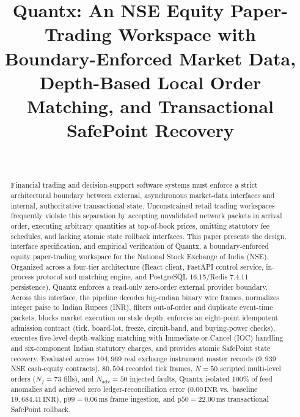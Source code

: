 \documentclass[journal,onecolumn,10pt]{IEEEtran}
\newcommand{\thinunit}[2]{#1\,\text{#2}}
\begin{document}
\title{Quantx: An NSE Equity Paper-Trading Workspace with Boundary-Enforced Market Data, Depth-Based Local Order Matching, and Transactional SafePoint Recovery}

\author{\\
}

\maketitle

\begin{abstract}
Financial trading and decision-support software systems must enforce a strict architectural boundary between external, asynchronous market-data interfaces and internal, authoritative transactional state. Unconstrained retail trading workspaces frequently violate this separation by accepting unvalidated network packets in arrival order, executing arbitrary quantities at top-of-book prices, omitting statutory fee schedules, and lacking atomic state rollback interfaces. This paper presents the design, interface specification, and empirical verification of Quantx, a boundary-enforced equity paper-trading workspace for the National Stock Exchange of India (NSE). Organized across a four-tier architecture (React client, FastAPI control service, in-process protocol and matching engine, and PostgreSQL 16.15/Redis 7.4.11 persistence), Quantx enforces a read-only zero-order external provider boundary. Across this interface, the pipeline decodes big-endian binary wire frames, normalizes integer paise to Indian Rupees (INR), filters out-of-order and duplicate event-time packets, blocks market execution on stale depth, enforces an eight-point idempotent admission contract (tick, board-lot, freeze, circuit-band, and buying-power checks), executes five-level depth-walking matching with Immediate-or-Cancel (IOC) handling and six-component Indian statutory charges, and provides atomic SafePoint state recovery. Evaluated across $104{,}969$ real exchange instrument master records ($9{,}939$ NSE cash-equity contracts), $80{,}504$ recorded tick frames, $N=50$ scripted multi-level orders ($N_f=73$ fills), and $N_{\mathrm{adv}}=50$ injected faults, Quantx isolated $100\%$ of feed anomalies and achieved zero ledger-reconciliation error ($\thinunit{0.00}{INR}$ vs.\ baseline $\thinunit{19{,}684.41}{INR}$), $\text{p99}=\thinunit{0.06}{ms}$ frame ingestion, and $\text{p50}=\thinunit{22.00}{ms}$ transactional SafePoint rollback.
\end{abstract}
\end{document}
